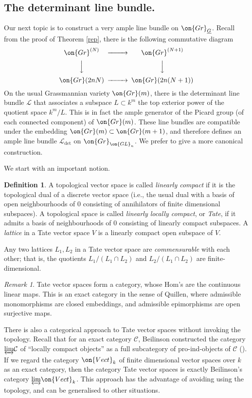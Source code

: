 \documentclass[]{pcmi}
\theoremstyle{plain}
\theoremstyle{remark}
\newtheorem{rmk}[equation]{Remark}
\theoremstyle{definition}
\newtheorem{dfn}[equation]{Definition}
\newcommand{\mC}{{\mathcal C}}
\newcommand{\mL}{{\mathcal L}}
\newcommand{\Gr}{{\on{Gr}}}
\newcommand{\GL}{{\on{GL}}}
\begin{document}
\subsection{The determinant line bundle.}\label{determinant line}
Our next topic is to construct a very ample line bundle on $\Gr_{\underline G}$. Recall from the proof of Theorem \ref{rep}, there is the following commutative diagram
\[\begin{CD}
\Gr^{(N)}@>>>\Gr^{(N+1)}\\
@VVV@VVV\\
\Gr(2nN)@>>>\Gr(2n(N+1))
\end{CD}\]
On the usual Grassmannian variety $\Gr(m)$, there is the determinant line bundle $\mL$ that associates a subspace $L\subset k^m$ the top exterior power of the quotient space $k^m/L$. This is in fact the ample generator of the Picard group (of each connected component) of $\Gr(m)$. These line bundles are compatible under the embedding $\Gr(m)\subset \Gr(m+1)$, and therefore defines an ample line bundle $\mL_{\det}$ on $\Gr_{\GL_n}$. We prefer to give a more canonical construction.

We start with an important notion.

\begin{dfn} A topological vector space is called \emph{linearly
    compact} if it is the topological dual of a discrete vector space
  (i.e., the usual dual with a basis of open neighbourhoods of $0$
  consisting of annihilators of finite dimensional subspaces). A
  topological space is called \emph{linearly locally compact}, or {\em
    Tate}, if it admits a basis of neighbourhoods of $0$ consisting of
  linearly compact subspaces. A \emph{lattice} in a Tate vector space
  $V$ is a linearly compact open subspace of $V$. 
\end{dfn}


Any two lattices $L_1, L_2$ in a Tate vector space are {\em
commensurable} with each other; that is, the quotients $L_1/(L_1
\cap L_2)$ and $L_2/(L_1 \cap L_2)$ are finite-dimensional.

\begin{rmk}\label{exact str} 
Tate vector spaces form a category, whose Hom's are the continuous
linear maps. This is an exact category in the sense of Quillen, where admissible monomorphisms are closed embeddings, and admissible epimorphisms are open surjective maps.

There is also a categorical approach to Tate vector spaces without invoking the topology. Recall that for an exact category $\mC$, Beilinson constructed the category $\underleftrightarrow{\lim} \mC$ of ``locally compact objects'' as a full subcategory of pro-ind-objects of $\mC$ (\cite[Appendix]{Be}). If we regard the category $\on{Vect}_k$ of finite dimensional vector spaces over $k$ as an exact category, 
then the category Tate vector spaces is exactly Beilinson's category $\underleftrightarrow{\lim}\on{Vect}_k$.  This approach has the advantage of avoiding using the topology, and can be generalised to other situations.
\end{rmk}
\end{document}
